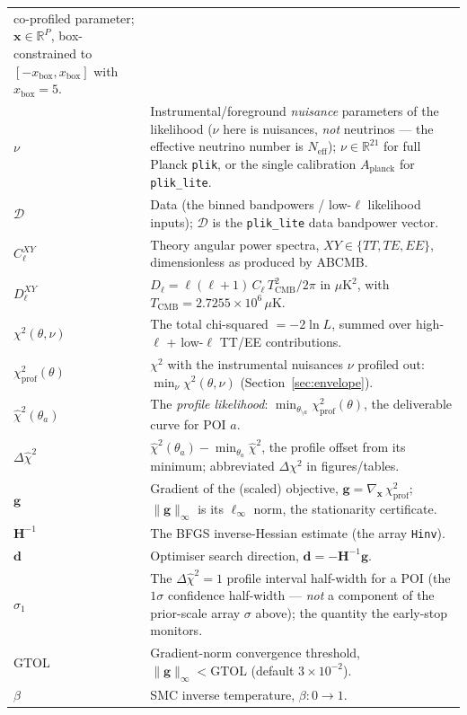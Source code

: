 \documentclass[11pt]{article}
\newcommand{\code}[1]{\texttt{\small #1}}
\newcommand{\Neff}{N_{\mathrm{eff}}}
\newcommand{\Cl}{C_\ell}
\newcommand{\Dl}{D_\ell}
\newcommand{\chisq}{\chi^2}
\newcommand{\dchisq}{\Delta\hat\chi^2}
\newcommand{\ginf}{\lVert \bm{g}\rVert_\infty}
\newcommand{\R}{\mathbb{R}}
\newcommand{\Tcmb}{T_{\mathrm{CMB}}}
\begin{document}
\begin{longtable}{p{}p{}}
co-profiled parameter; $\bm{x}\in\R^{P}$, box-constrained to
$[-x_{\mathrm{box}},x_{\mathrm{box}}]$ with $x_{\mathrm{box}}=5$. \\
$\nu$ & Instrumental/foreground \emph{nuisance} parameters of the
likelihood ($\nu$ here is nuisances, \emph{not} neutrinos --- the effective
neutrino number is $\Neff$); $\nu\in\R^{21}$ for full Planck \code{plik}, or
the single calibration $A_{\mathrm{planck}}$ for \code{plik\_lite}. \\
$\mathcal{D}$ & Data (the binned bandpowers / low-$\ell$ likelihood
inputs); $\bm{\mathcal{D}}$ is the \code{plik\_lite} data bandpower
vector. \\
$\Cl^{XY}$ & Theory angular power spectra, $XY\in\{TT,TE,EE\}$,
dimensionless as produced by \textsc{ABCMB}. \\
$\Dl^{XY}$ & $\Dl=\ell(\ell+1)\,\Cl\,\Tcmb^2/2\pi$ in $\mu\mathrm{K}^2$,
with $\Tcmb=2.7255\times10^{6}\,\mu\mathrm{K}$. \\
$\chisq(\theta,\nu)$ & The total chi-squared $=-2\ln L$, summed over
high-$\ell$ + low-$\ell$ TT/EE contributions. \\
$\chisq_{\mathrm{prof}}(\theta)$ & $\chisq$ with the instrumental
nuisances $\nu$ profiled out: $\min_\nu\chisq(\theta,\nu)$
(Section~\ref{sec:envelope}). \\
$\hat\chisq(\theta_a)$ & The \emph{profile likelihood}:
$\min_{\theta_{\setminus a}}\chisq_{\mathrm{prof}}(\theta)$, the deliverable
curve for POI $a$. \\
$\dchisq$ & $\hat\chisq(\theta_a)-\min_{\theta_a}\hat\chisq$, the profile
offset from its minimum; abbreviated $\Delta\chisq$ in figures/tables. \\
$\bm{g}$ & Gradient of the (scaled) objective,
$\bm{g}=\nabla_{\bm x}\,\chisq_{\mathrm{prof}}$; $\ginf$ is its
$\ell_\infty$ norm, the stationarity certificate. \\
$\bm{H}^{-1}$ & The BFGS inverse-Hessian estimate (the array \code{Hinv}). \\
$\bm{d}$ & Optimiser search direction, $\bm d=-\bm H^{-1}\bm g$. \\
$\sigma_1$ & The $\dchisq=1$ profile interval half-width for a POI (the
$1\sigma$ confidence half-width --- \emph{not} a component of the
prior-scale array $\sigma$ above); the quantity the early-stop monitors. \\
$\mathrm{GTOL}$ & Gradient-norm convergence threshold,
$\ginf<\mathrm{GTOL}$ (default $3\times10^{-2}$). \\
$\beta$ & SMC inverse temperature, $\beta:0\!\to\!1$. \\

\end{longtable}
\end{document}
